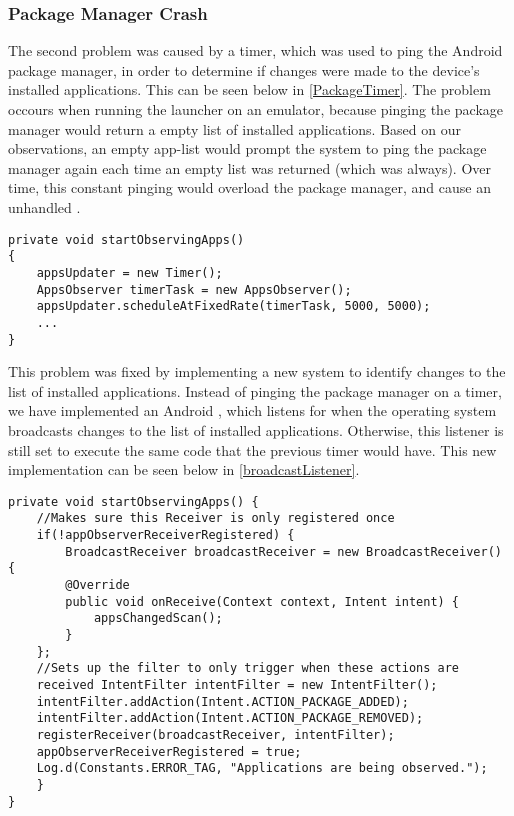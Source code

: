 \subsubsection{Package Manager Crash}
The second problem was caused by a timer, which was used to ping the Android
package manager, in order to determine if changes were made to the device's
installed applications. This can be seen below in \autoref{PackageTimer}. The
problem occours when running the launcher on an emulator, because pinging the package
manager would return a empty list of installed applications. Based on our
observations, an empty app-list would prompt the system to ping the package
manager again each time an empty list was returned (which was always). Over
time, this constant pinging would overload the package manager, and cause an
unhandled .\nl

\begin{minipage}[H]{\linewidth}
\begin{lstlisting}[caption = The timer in the \textc{HomeActivity} class which pings the package manager., label = PackageTimer] 
private void startObservingApps() 
{ 
	appsUpdater = new Timer();
    AppsObserver timerTask = new AppsObserver();
    appsUpdater.scheduleAtFixedRate(timerTask, 5000, 5000);
 	...
}   	
\end{lstlisting}
\end{minipage}

This problem was fixed by implementing a new system to identify changes to the
list of installed applications. Instead of pinging the package manager on a
timer, we have implemented an Android , which listens
for when the operating system broadcasts changes to the list of installed
applications. Otherwise, this listener is still set to execute the same code
that the previous timer would have. This new implementation can be seen below in
\autoref{broadcastListener}.\nl

\begin{minipage}[H]{\linewidth}
\begin{lstlisting}[caption = New implementation of a \textc{broadcastReceiver}., label = broadcastListener] 
private void startObservingApps() {
	//Makes sure this Receiver is only registered once
    if(!appObserverReceiverRegistered) {
    	BroadcastReceiver broadcastReceiver = new BroadcastReceiver() {
        @Override
        public void onReceive(Context context, Intent intent) {
        	appsChangedScan();
        }
    };
    //Sets up the filter to only trigger when these actions are
    received IntentFilter intentFilter = new IntentFilter();
    intentFilter.addAction(Intent.ACTION_PACKAGE_ADDED);
    intentFilter.addAction(Intent.ACTION_PACKAGE_REMOVED);
    registerReceiver(broadcastReceiver, intentFilter);
    appObserverReceiverRegistered = true;
    Log.d(Constants.ERROR_TAG, "Applications are being observed.");
	}
}
\end{lstlisting}
\end{minipage}

